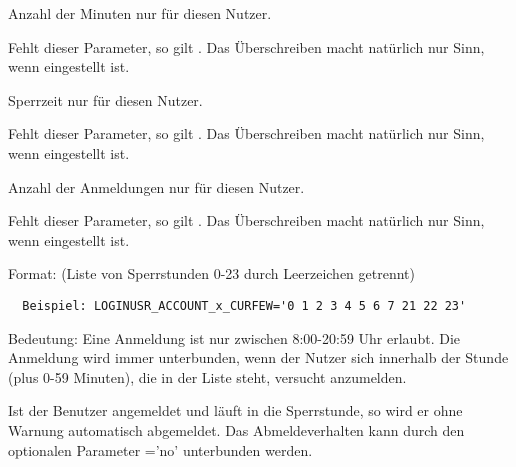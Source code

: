 \begin{description}



  Anzahl der Minuten nur für diesen Nutzer.

  Fehlt dieser Parameter, so gilt .
  Das Überschreiben macht natürlich nur Sinn, wenn  eingestellt ist.



  Sperrzeit nur für diesen Nutzer.

  Fehlt dieser Parameter, so gilt . 
  Das Überschreiben macht natürlich nur Sinn, wenn
   eingestellt ist.



  Anzahl der Anmeldungen nur für diesen Nutzer.

  Fehlt dieser Parameter, so gilt . 
  Das Überschreiben macht natürlich nur Sinn,
  wenn  eingestellt ist.



   Format: (Liste von Sperrstunden 0-23 durch Leerzeichen getrennt)
  \begin{example}
  \begin{verbatim}
  Beispiel: LOGINUSR_ACCOUNT_x_CURFEW='0 1 2 3 4 5 6 7 21 22 23'
  \end{verbatim}
  \end{example}
  Bedeutung: Eine Anmeldung ist nur zwischen 8:00-20:59 Uhr erlaubt. Die Anmeldung wird immer unterbunden,
  wenn der Nutzer sich innerhalb der Stunde (plus 0-59 Minuten), die in der Liste steht, versucht anzumelden.

  Ist der Benutzer angemeldet und läuft in die Sperrstunde, so wird er ohne Warnung automatisch abgemeldet.
  Das Abmeldeverhalten kann durch den optionalen Parameter 
  {}='no' unterbunden werden.
   

\end{description}
